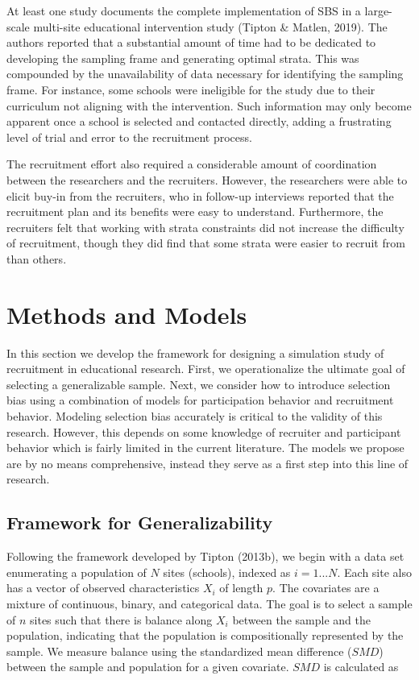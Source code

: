 \documentclass[
  english,
  man,floatsintext]{apa6}
\begin{document}
At least one study documents the complete implementation of SBS in a large-scale multi-site educational intervention study (Tipton \& Matlen, 2019). The authors reported that a substantial amount of time had to be dedicated to developing the sampling frame and generating optimal strata. This was compounded by the unavailability of data necessary for identifying the sampling frame. For instance, some schools were ineligible for the study due to their curriculum not aligning with the intervention. Such information may only become apparent once a school is selected and contacted directly, adding a frustrating level of trial and error to the recruitment process.

The recruitment effort also required a considerable amount of coordination between the researchers and the recruiters. However, the researchers were able to elicit buy-in from the recruiters, who in follow-up interviews reported that the recruitment plan and its benefits were easy to understand. Furthermore, the recruiters felt that working with strata constraints did not increase the difficulty of recruitment, though they did find that some strata were easier to recruit from than others.

\hypertarget{methods-and-models}{%
\section{Methods and Models}\label{methods-and-models}}

In this section we develop the framework for designing a simulation study of recruitment in educational research. First, we operationalize the ultimate goal of selecting a generalizable sample. Next, we consider how to introduce selection bias using a combination of models for participation behavior and recruitment behavior. Modeling selection bias accurately is critical to the validity of this research. However, this depends on some knowledge of recruiter and participant behavior which is fairly limited in the current literature. The models we propose are by no means comprehensive, instead they serve as a first step into this line of research.

\hypertarget{framework-for-generalizability}{%
\subsection{Framework for Generalizability}\label{framework-for-generalizability}}

Following the framework developed by Tipton (2013b), we begin with a data set enumerating a population of \(N\) sites (schools), indexed as \(i = 1 ... N\). Each site also has a vector of observed characteristics \(X_i\) of length \(p\). The covariates are a mixture of continuous, binary, and categorical data. The goal is to select a sample of \(n\) sites such that there is balance along \(X_i\) between the sample and the population, indicating that the population is compositionally represented by the sample. We measure balance using the standardized mean difference (\(SMD\)) between the sample and population for a given covariate. \(SMD\) is calculated as
\end{document}

